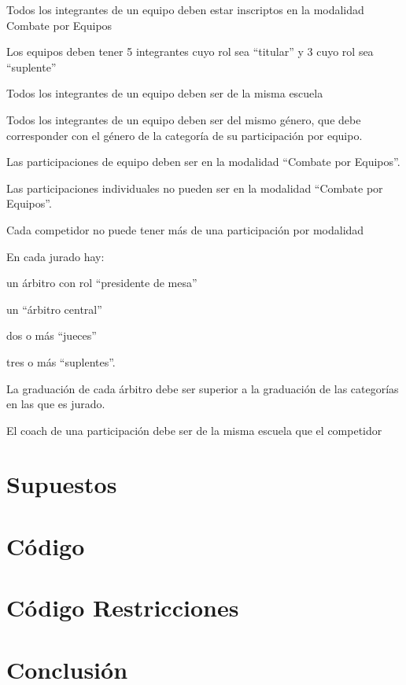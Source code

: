 \documentclass[a4paper]{article}
\begin{document}
Todos los integrantes de un equipo deben estar inscriptos en la modalidad Combate por Equipos

Los equipos deben tener 5 integrantes cuyo rol sea “titular” y 3 cuyo rol sea “suplente”

Todos los integrantes de un equipo deben ser de la misma escuela

Todos los integrantes de un equipo deben ser del mismo género, que debe corresponder con el género de la categoría de su participación por equipo.

Las participaciones de equipo deben ser en la modalidad “Combate por Equipos”.

Las participaciones individuales no pueden ser en la modalidad “Combate por Equipos”.

Cada competidor no puede tener más de una participación por modalidad

En cada jurado hay:

un árbitro con rol “presidente de mesa”

un “árbitro central”

dos o más “jueces”

tres o más “suplentes”.

La graduación de cada árbitro debe ser superior a la graduación de las categorías en las que es jurado. 

El coach de una participación debe ser de la misma escuela que el competidor

\section{Supuestos}

\section{Código}

\section{Código Restricciones}

\section{Conclusión}

\newpage
\end{document}
